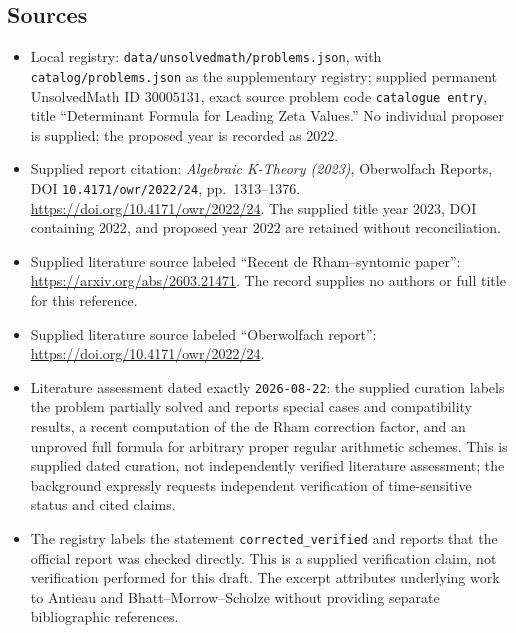 \documentclass[11pt]{article}
\begin{document}
\subsection{Sources}
\begin{itemize}
\item Local registry: \texttt{data/unsolvedmath/problems.json}, with \texttt{catalog/problems.json} as the supplementary registry; supplied permanent UnsolvedMath ID \(30005131\), exact source problem code \texttt{catalogue entry}, title ``Determinant Formula for Leading Zeta Values.'' No individual proposer is supplied; the proposed year is recorded as \(2022\).
\item Supplied report citation: \emph{Algebraic K-Theory (2023)}, Oberwolfach Reports, DOI \texttt{10.4171/owr/2022/24}, pp.\ 1313--1376. \url{https://doi.org/10.4171/owr/2022/24}. The supplied title year \(2023\), DOI containing \(2022\), and proposed year \(2022\) are retained without reconciliation.
\item Supplied literature source labeled ``Recent de Rham--syntomic paper'': \url{https://arxiv.org/abs/2603.21471}. The record supplies no authors or full title for this reference.
\item Supplied literature source labeled ``Oberwolfach report'': \url{https://doi.org/10.4171/owr/2022/24}.
\item Literature assessment dated exactly \texttt{2026-08-22}: the supplied curation labels the problem partially solved and reports special cases and compatibility results, a recent computation of the de Rham correction factor, and an unproved full formula for arbitrary proper regular arithmetic schemes. This is supplied dated curation, not independently verified literature assessment; the background expressly requests independent verification of time-sensitive status and cited claims.
\item The registry labels the statement \texttt{corrected\_verified} and reports that the official report was checked directly. This is a supplied verification claim, not verification performed for this draft. The excerpt attributes underlying work to Antieau and Bhatt--Morrow--Scholze without providing separate bibliographic references.
\end{itemize}
\end{document}

